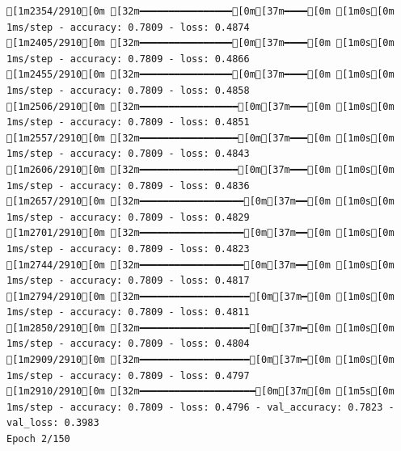 \documentclass[
  letterpaper,
  DIV=11,
  numbers=noendperiod]{scrartcl}
\begin{document}
\begin{verbatim}
[1m2354/2910[0m [32m━━━━━━━━━━━━━━━━[0m[37m━━━━[0m [1m0s[0m 1ms/step - accuracy: 0.7809 - loss: 0.4874
[1m2405/2910[0m [32m━━━━━━━━━━━━━━━━[0m[37m━━━━[0m [1m0s[0m 1ms/step - accuracy: 0.7809 - loss: 0.4866
[1m2455/2910[0m [32m━━━━━━━━━━━━━━━━[0m[37m━━━━[0m [1m0s[0m 1ms/step - accuracy: 0.7809 - loss: 0.4858
[1m2506/2910[0m [32m━━━━━━━━━━━━━━━━━[0m[37m━━━[0m [1m0s[0m 1ms/step - accuracy: 0.7809 - loss: 0.4851
[1m2557/2910[0m [32m━━━━━━━━━━━━━━━━━[0m[37m━━━[0m [1m0s[0m 1ms/step - accuracy: 0.7809 - loss: 0.4843
[1m2606/2910[0m [32m━━━━━━━━━━━━━━━━━[0m[37m━━━[0m [1m0s[0m 1ms/step - accuracy: 0.7809 - loss: 0.4836
[1m2657/2910[0m [32m━━━━━━━━━━━━━━━━━━[0m[37m━━[0m [1m0s[0m 1ms/step - accuracy: 0.7809 - loss: 0.4829
[1m2701/2910[0m [32m━━━━━━━━━━━━━━━━━━[0m[37m━━[0m [1m0s[0m 1ms/step - accuracy: 0.7809 - loss: 0.4823
[1m2744/2910[0m [32m━━━━━━━━━━━━━━━━━━[0m[37m━━[0m [1m0s[0m 1ms/step - accuracy: 0.7809 - loss: 0.4817
[1m2794/2910[0m [32m━━━━━━━━━━━━━━━━━━━[0m[37m━[0m [1m0s[0m 1ms/step - accuracy: 0.7809 - loss: 0.4811
[1m2850/2910[0m [32m━━━━━━━━━━━━━━━━━━━[0m[37m━[0m [1m0s[0m 1ms/step - accuracy: 0.7809 - loss: 0.4804
[1m2909/2910[0m [32m━━━━━━━━━━━━━━━━━━━[0m[37m━[0m [1m0s[0m 1ms/step - accuracy: 0.7809 - loss: 0.4797
[1m2910/2910[0m [32m━━━━━━━━━━━━━━━━━━━━[0m[37m[0m [1m5s[0m 1ms/step - accuracy: 0.7809 - loss: 0.4796 - val_accuracy: 0.7823 - val_loss: 0.3983
Epoch 2/150


\end{verbatim}
\end{document}
